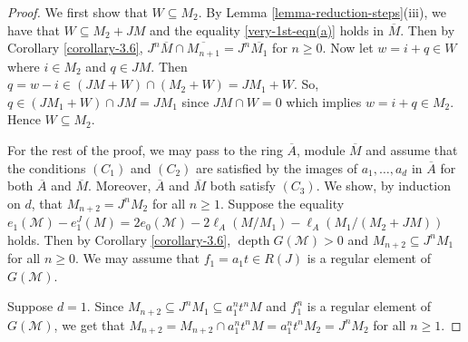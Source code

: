 \documentclass[10pt,a4paper]{amsart}
\def\M{{\mathcal M}}
\DeclareMathOperator{\depth}{depth}
\begin{document}
\begin{proof}
 We first show that $W\subseteq M_2$.  By Lemma \ref{lemma-reduction-steps}(iii), we have that $W\subseteq M_2+JM$ and the equality \eqref{very-1st-eqn(a)} holds in $\overline{M}$. Then by Corollary \ref{corollary-3.6}, $J^n\overline{M}\cap \overline{M_{n+1}}=J^n\overline{M_1}$ for $n\geq 0$. 
 Now let $w=i+q\in W$ where $i\in M_2$ and $q\in JM$. Then $q=w-i\in (JM+W)\cap (M_2+W)=JM_1+W$.
	So, $q\in (JM_1+W)\cap JM=JM_1$ since $JM\cap W=0$ which implies $w=i+q\in M_2$. Hence $W\subseteq M_2$.
	
	For the rest of the proof, we may pass to the ring $\overline{A}$, module $\overline{M}$ and assume that the conditions $(C_1)$ and $(C_2)$ are satisfied by the images of $a_1,\ldots,a_d$ in $\overline{A}$ for both $\overline{A}$ and $\overline{M}.$ Moreover,  $\overline{A}$ and $\overline{M}$ both satisfy $(C_3)$. 
	We show, by induction on $d$, that $M_{n+2}= J^n M_2$ for all $n\geq 1$. Suppose the equality  $e_1(\M)-e_1^J(M)=2e_0(\M)-2\ell_A(M/M_1)-\ell_A(M_1/(M_2+JM))$
	holds. Then
	by Corollary \ref{corollary-3.6}, $\depth G(\M)>0$ and $M_{n+2}\subseteq J^n M_1$ for all $n\geq 0.$
	We may assume that 
	$f_1=a_1t\in R(J)$ is a regular element of $G(\M)$.
	
	Suppose $d=1$. Since $M_{n+2}\subseteq J^n M_1\subseteq a_1^nt^nM$ and $f_1^n$ is a regular element of $G(\M)$,  we get that $M_{n+2}=M_{n+2}\cap a_1^nt^nM=a_1^nt^nM_2= J^nM_2$ for all $n\geq 1$.
	

\end{proof}
\end{document}
